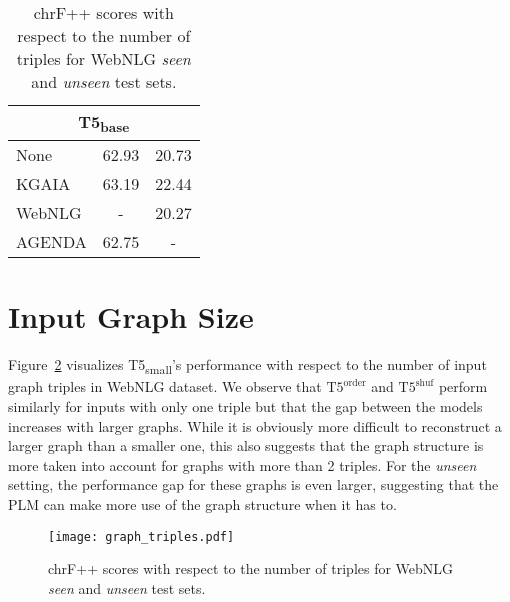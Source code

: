 \documentclass[11pt]{article}
\newcommand{\shufmodel}[3]{\ensuremath{\text{#1}^{\text{#3}}}}
\begin{document}
\begin{table}[t]
\begin{table}[h]
{\begin{tabular}{lcc}
\midrule
\multicolumn{3}{c}{T5\textsubscript{base}} \\
\midrule
None & 62.93 & 20.73 \\
KGAIA & 63.19 & 22.44 \\
WebNLG & - & 20.27 \\
AGENDA & 62.75 & - \\

\bottomrule
\end{tabular}}
\caption{Effect (measured with BLEU score) of cross-domain \textsc{sta}.}
\label{tab:crossdomain_adddata}
\end{table}
\vspace{-5mm}

\section{Input Graph Size}
\label{section:inputgraphsize}
Figure~\ref{fig:graphs-triples} visualizes T5\textsubscript{small}'s performance with respect to the number of input graph triples in WebNLG dataset.
We observe that \shufmodel{T5}{small}{order} and \shufmodel{T5}{small}{shuf} perform similarly for inputs with only one triple but that the gap between the models increases with larger graphs. While it is obviously more difficult to reconstruct a larger graph than a smaller one, this also suggests that the graph structure is more taken into account for graphs with more than 2 triples.
For the \textit{unseen} setting, the performance gap for these graphs is even larger, suggesting that the PLM can make more use of the graph structure when it has to.

 \begin{figure}[h]
    \centering
    \texttt{[image: graph\_triples.pdf]}
    \caption{chrF++ scores with respect to the number of triples for WebNLG \textit{seen} and \textit{unseen} test sets.}
    \label{fig:graphs-triples}
\end{figure}
\vspace{-6mm}



\end{table}
\end{document}

